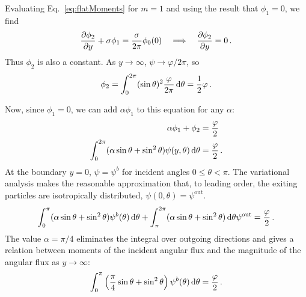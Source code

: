Evaluating Eq.~\eqref{eq:flatMoments} for $m=1$ and using the result that
$\phi_{1}=0$, we find
\begin{equation*}
  \frac{\partial \phi_{2}}{\partial y}
  + \sigma \phi_{1}
  = \frac{\sigma}{2\pi} \phi_{0} (0)
  \quad \Longrightarrow \quad
  \frac{\partial \phi_{2}}{\partial y} = 0\,.
\end{equation*}
Thus $\phi_{2}$ is also a constant. As $y\to\infty$, $\psi\to\varphi/2\pi$, so
\begin{equation*}
  \phi_{2} = \int_{0}^{2\pi} (\sin\theta)^2 \frac{\varphi}{2\pi} \mathop{}\!\mathrm{d}\theta
  = \frac{1}{2} \varphi\,.
\end{equation*}

Now, since $\phi_1=0$, we can add $\alpha \phi_1$ to this equation for any
$\alpha$:
\begin{align*}
 \alpha\phi_1 + \phi_{2} &= \frac{\varphi}{2} \\
 \int_{0}^{2\pi} (\alpha \sin\theta + \sin^2\theta)
 \psi(y,\theta) \mathop{}\!\mathrm{d}\theta
 &= \frac{\varphi}{2}\,.
\end{align*}
At the boundary $y=0$, $\psi=\psi^b$ for incident angles $0 \le \theta < \pi$. The
variational analysis makes the reasonable approximation that, to leading order,
the exiting particles are isotropically distributed, $\psi(0,\theta)=\psi^\text{out}$.
\begin{equation*}
 \int_{0}^{\pi} (\alpha \sin\theta + \sin^2\theta)
 \psi^b(\theta) \mathop{}\!\mathrm{d}\theta
 + \int_{\pi}^{2\pi} (\alpha \sin\theta + \sin^2\theta)\mathop{}\!\mathrm{d}\theta \psi^\text{out}
 = \frac{\varphi}{2}\,.
\end{equation*}
The value $\alpha=\pi/4$ eliminates the integral over outgoing directions and
gives a relation between moments of the incident angular flux and the
magnitude of the angular flux as $y\to\infty$:
\begin{equation}\label{eq:varBoundary}
  \int_{0}^{\pi} \left( \frac{\pi}{4} \sin\theta + \sin^2\theta \right)
 \psi^b(\theta) \mathop{}\!\mathrm{d}\theta
 = \frac{\varphi}{2}\,.
\end{equation}

